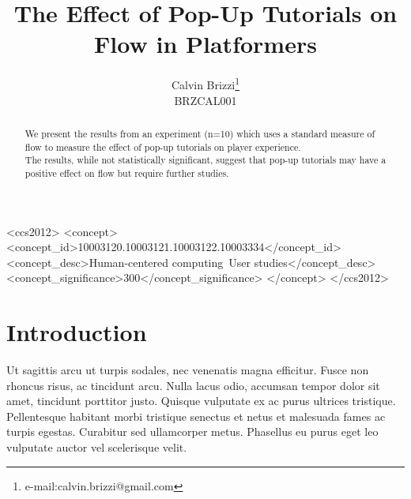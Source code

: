 \documentclass{acmsiggraph}
\title{The Effect of Pop-Up Tutorials on Flow in Platformers}
\author{Calvin Brizzi\thanks{e-mail:calvin.brizzi@gmail.com}\\BRZCAL001}
\begin{document}


\maketitle

\begin{abstract}

We present the results from an experiment (n=10) which uses a standard measure of flow to measure the effect of pop-up tutorials on player experience.\\
The results, while not statistically significant, suggest that pop-up tutorials may have a positive effect on flow but require further studies.

\end{abstract}

%
%
\begin{CCSXML}
<ccs2012>
<concept>
<concept_id>10003120.10003121.10003122.10003334</concept_id>
<concept_desc>Human-centered computing~User studies</concept_desc>
<concept_significance>300</concept_significance>
</concept>
</ccs2012>
\end{CCSXML}


%
%


\keywordlist

\conceptlist

\printcopyright

\section{Introduction}

Ut sagittis arcu ut turpis sodales, nec venenatis magna efficitur. Fusce non rhoncus risus, ac tincidunt arcu. Nulla lacus odio, accumsan tempor dolor sit amet, tincidunt porttitor justo. Quisque vulputate ex ac purus ultrices tristique. Pellentesque habitant morbi tristique senectus et netus et malesuada fames ac turpis egestas. Curabitur sed ullamcorper metus. Phasellus eu purus eget leo vulputate auctor vel scelerisque velit.
\end{document}

